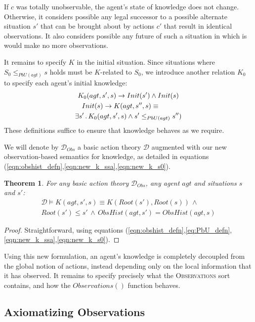 \documentclass{ifaamas-submission}
\newcommand{\noun}[1]{\textsc{#1}}
\newtheorem{theorem}{Theorem}
\begin{document}
If $c$ was totally unobservable, the agent's state of knowledge does
not change. Otherwise, it considers possible any legal successor to
a possible alternate situation $s'$ that can be brought about by
actions $c'$ that result in identical observations. It also considers
possible any future of such a situation in which is would make no
more observations.

It remains to specify $K$ in the initial situation. Since situations
where $S_{0}\leq_{PbU(agt)}s$ holds must be $K$-related to $S_{0}$,
we introduce another relation $K_{0}$ to specify each agent's initial
knowledge: \begin{multline}
K_{0}(agt,s',s)\rightarrow Init(s')\wedge Init(s)\\
\shoveleft{Init(s)\rightarrow K(agt,s'',s)\equiv}\\
\exists s'\,.\, K_{0}(agt,s',s)\wedge s'\leq_{PbU(agt)}s'')\label{eqn:new_k_s0}\end{multline}
 These definitions suffice to ensure that knowledge behaves as we
require.

\begin{definition}
We will denote by $\mathcal{D}_{Obs}$ a basic action theory $\mathcal{D}$
augmented with our new observation-based semantics for knowledge,
as detailed in equations (\ref{eqn:obshist_defn},\ref{eqn:new_k_ssa},\ref{eqn:new_k_s0}).
\end{definition}
\begin{theorem}
\label{thm:k_obs_equiv} For any basic action theory $\mathcal{D}_{Obs}$,
any agent $agt$ and situations $s$ and $s'$:\begin{multline*}
\mathcal{D}\models K(agt,s',s)\equiv K(Root(s'),Root(s))\,\wedge\\
Root(s')\leq s'\,\wedge\, ObsHist(agt,s')=ObsHist(agt,s)\end{multline*}

\end{theorem}
\begin{proof}
Straightforward, using equations (\ref{eqn:obshist_defn},\ref{eq:PbU_defn},\ref{eqn:new_k_ssa},\ref{eqn:new_k_s0}). 
\end{proof}%
Using this new formulation, an agent's knowledge is completely decoupled
from the global notion of actions, instead depending only on the local
information that it has observed. It remains to specify precisely
what the \noun{Observations} sort contains, and how the $Observations()$
function behaves.


\subsection{Axiomatizing Observations}
\end{document}

